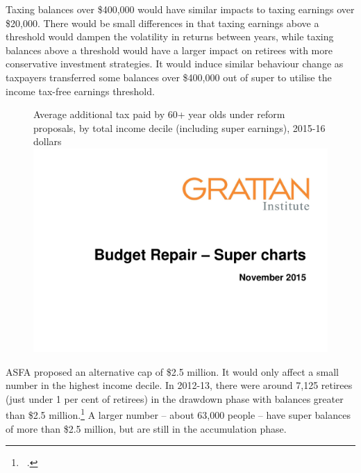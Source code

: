 Taxing balances over \$400,000 would have similar impacts to taxing earnings over \$20,000. There would be small differences in that taxing earnings above a threshold would dampen the volatility in returns between years, while taxing balances above a threshold would have a larger impact on retirees with more conservative investment strategies. It would induce similar behaviour change as taxpayers transferred some balances over \$400,000 out of super to utilise the income tax-free earnings threshold. 

\begin{figure}[!t]
%
{Average additional tax paid by 60+ year olds under reform proposals, by total income decile (including super earnings), 2015-16 dollars}
\includegraphics[width=\columnwidth,page=32]{super-atlas/PPTX.pdf}

\end{figure} 

ASFA proposed an alternative cap of \$2.5 million. It would only affect a small number in the highest income decile. In 2012-13, there were around 7,125 retirees (just under 1 per cent of retirees) in the drawdown phase with balances greater than \$2.5 million.\footnote{\gao\ \textcite{ABS2013t}.}   A larger number – about 63,000 people – have super balances of more than \$2.5 million, but are still in the accumulation phase.

